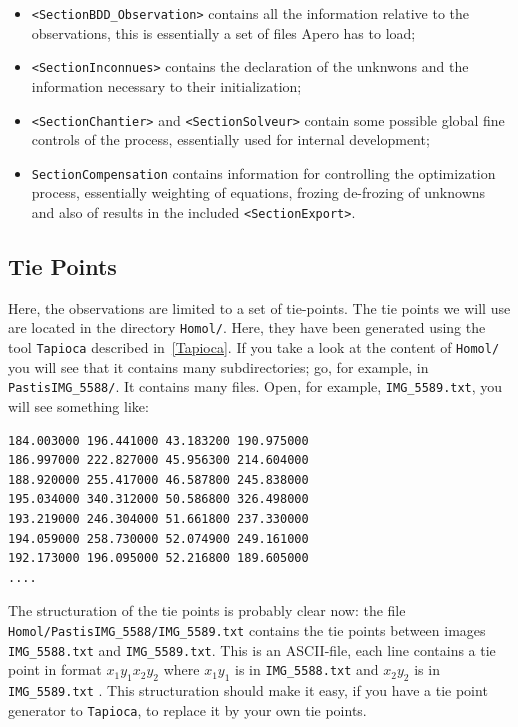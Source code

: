 \begin{itemize}
       \item {\tt <SectionBDD\_Observation>} contains all the information 
             relative to the observations, this is essentially a set of files
             Apero has to load;

      \item  {\tt <SectionInconnues>} contains the declaration of the
             unknwons and the information necessary to their initialization;

      \item  {\tt <SectionChantier>} and {\tt <SectionSolveur>} contain some possible
             global fine controls of the process, essentially used for internal development;

       \item  {\tt SectionCompensation} contains information for controlling the
              optimization process, essentially weighting of equations, frozing de-frozing
              of unknowns and also  of results in the  included {\tt <SectionExport>}.
\end{itemize}

\subsection{Tie Points}

\label{Tie:Poi:Ex:Apero}

Here, the observations are limited to a set of tie-points. The tie points 
we will use are located in the directory {\tt Homol/}. Here, they have been
generated using the tool {\tt Tapioca} described in~\ref{Tapioca}. If you
take a look at the content of {\tt Homol/} you will see that it contains
many subdirectories; go, for example, in {\tt PastisIMG\_5588/}.
It contains many files. Open, for example, {\tt IMG\_5589.txt},
you will see something like:

{\scriptsize
\begin{verbatim}
184.003000 196.441000 43.183200 190.975000
186.997000 222.827000 45.956300 214.604000
188.920000 255.417000 46.587800 245.838000
195.034000 340.312000 50.586800 326.498000
193.219000 246.304000 51.661800 237.330000
194.059000 258.730000 52.074900 249.161000
192.173000 196.095000 52.216800 189.605000
....
\end{verbatim}
}

The structuration of the tie points is probably clear now:
the file {\tt Homol/PastisIMG\_5588/IMG\_5589.txt} contains
the tie points between images {\tt IMG\_5588.txt} and {\tt IMG\_5589.txt}.
This is an ASCII-file, each line contains a tie point in format $x_1 y_1 x_2 y_2$
where $x_1 y_1$ is in {\tt  IMG\_5588.txt} and $x_2 y_2$ is in {\tt  IMG\_5589.txt} .
This structuration should make it easy, if you have a tie point 
generator  to {\tt Tapioca}, to replace it by your own tie points.


